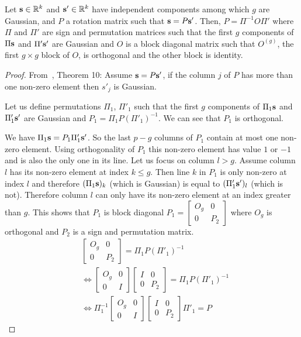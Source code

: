 \documentclass[12pt]{report}
\begin{document}
\begin{lemma}
\label{lemma:ica}
Let $\mathbf{s} \in \mathbb{R}^k$ and $\mathbf{s}'\in \mathbb{R}^k$ have independent components among which $g$ are Gaussian, and $P$ a rotation matrix such that $\mathbf{s} = P\mathbf{s}'$. Then, $P=\Pi^{-1} O \Pi'$ where $\Pi$ and $\Pi'$ are sign and permutation matrices such that the first $g$ components of $\Pi \mathbf{s}$ and $\Pi' \mathbf{s}'$ are Gaussian and $O$ is a block diagonal matrix such that $O^{(g)}$, the first $g \times g$ block of $O$, is orthogonal and the other block is identity.
\end{lemma}
\begin{proof}
  From~\cite{comon1994independent}, Theorem 10:
  Assume $\mathbf{s} = P\mathbf{s}'$, if the column $j$ of $P$ has more than one non-zero element then $s'_j$ is Gaussian. 
  
  Let us define permutations $\Pi_1$, $\Pi'_1$ such that the first $g$ components of $\Pi_1 \mathbf{s}$ and $\Pi'_1 \mathbf{s}'$ are Gaussian and $P_1  = \Pi_1 P (\Pi'_1)^{-1}$. We can see that $P_1$ is orthogonal.
  
  We have $\Pi_1 \mathbf{s} = P_1 \Pi'_1 \mathbf{s}'$. So the last $p-g$ columns of $P_1$ contain at most one non-zero element. Using orthogonality of $P_1$ this non-zero element has value $1$ or $-1$ and is also the only one in its line. Let us focus on column $l > g$. Assume column $l$ has its non-zero element at index $k \leq g$. Then line $k$ in $P_1$ is only non-zero at index $l$ and therefore $(\Pi_1 \mathbf{s})_k$ (which is Gaussian) is equal to $(\Pi'_1 \mathbf{s}')_l$ (which is not). Therefore column $l$ can only have its non-zero element at an index greater than $g$. This shows that $P_1$ is block diagonal $P_1 = \begin{bmatrix} O_g & 0 \\ 0 & P_2 \end{bmatrix}$ where $O_g$ is orthogonal  and $P_2$ is a sign and permutation matrix.
  \begin{align}
      &\begin{bmatrix} O_g & 0 \\ 0 & P_2 \end{bmatrix} = \Pi_1 P (\Pi'_1)^{-1} \\
      & \iff \begin{bmatrix} O_g & 0 \\ 0 & I \end{bmatrix} \begin{bmatrix} I & 0 \\ 0 & P_2 \end{bmatrix}  = \Pi_1 P (\Pi'_1)^{-1} \\
      & \iff \Pi_1^{-1} \begin{bmatrix} O_g & 0 \\ 0 & I \end{bmatrix} \begin{bmatrix} I & 0 \\ 0 & P_2 \end{bmatrix} \Pi'_1  = P
  \end{align}
  

\end{proof}
\end{document}
